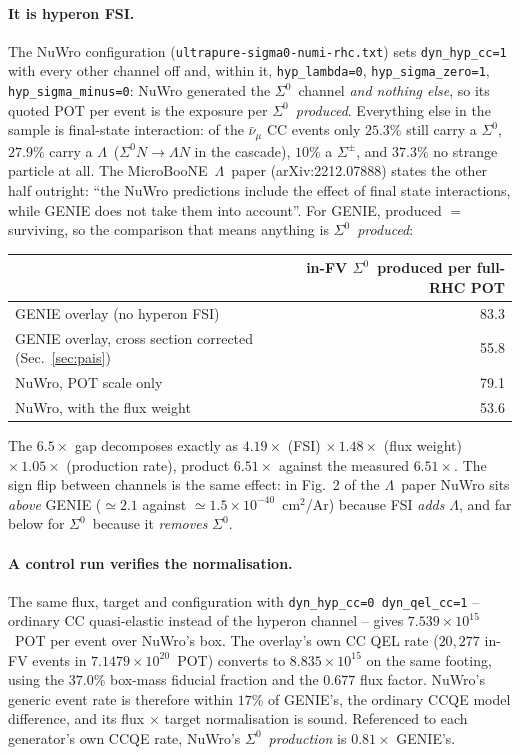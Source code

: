 \documentclass[11pt,a4paper]{article}
\newcommand{\Szero}{\ensuremath{\Sigma^{0}}}
\newcommand{\Lam}{\ensuremath{\Lambda}}
\newcommand{\uboone}{MicroBooNE}
\newcommand{\numubar}{\ensuremath{\bar{\nu}_\mu}}
\begin{document}
\paragraph{It is hyperon FSI.} The NuWro configuration
(\texttt{ultrapure-sigma0-numi-rhc.txt}) sets \texttt{dyn\_hyp\_cc=1} with every
other channel off and, within it, \texttt{hyp\_lambda=0},
\texttt{hyp\_sigma\_zero=1}, \texttt{hyp\_sigma\_minus=0}: NuWro generated the
\Szero\ channel \emph{and nothing else}, so its quoted POT per event is the exposure
per \Szero\ \emph{produced}. Everything else in the sample is final-state
interaction: of the $\numubar$ CC events only $25.3\%$ still carry a \Szero, $27.9\%$
carry a \Lam\ ($\Szero N \to \Lam N$ in the cascade), $10\%$ a $\Sigma^{\pm}$, and
$37.3\%$ no strange particle at all. The \uboone\ \Lam\ paper (arXiv:2212.07888)
states the other half outright: ``the NuWro predictions include the effect of final
state interactions, while GENIE does not take them into account''. For GENIE,
produced $=$ surviving, so the comparison that means anything is \Szero\
\emph{produced}:

\begin{center}
\begin{tabular}{lr}
\toprule
 & in-FV \Szero\ produced per full-RHC POT \\
\midrule
GENIE overlay (no hyperon FSI)      & 83.3 \\
GENIE overlay, cross section corrected (Sec.~\ref{sec:pais}) & 55.8 \\
NuWro, POT scale only               & 79.1 \\
NuWro, with the flux weight         & 53.6 \\
\bottomrule
\end{tabular}
\end{center}

\noindent The $6.5\times$ gap decomposes exactly as $4.19\times$ (FSI) $\times\,
1.48\times$ (flux weight) $\times\, 1.05\times$ (production rate), product
$6.51\times$ against the measured $6.51\times$. The sign flip between channels is
the same effect: in Fig.~2 of the \Lam\ paper NuWro sits \emph{above} GENIE
($\simeq2.1$ against $\simeq1.5 \times 10^{-40}$~cm$^2$/Ar) because FSI \emph{adds}
\Lam, and far below for \Szero\ because it \emph{removes} \Szero.

\paragraph{A control run verifies the normalisation.} The same flux, target and
configuration with \texttt{dyn\_hyp\_cc=0 dyn\_qel\_cc=1} -- ordinary CC
quasi-elastic instead of the hyperon channel -- gives $7.539\times10^{15}$~POT per
event over NuWro's box. The overlay's own CC QEL rate ($20{,}277$ in-FV events in
$7.1479\times10^{20}$~POT) converts to $8.835\times10^{15}$ on the same footing,
using the $37.0\%$ box-mass fiducial fraction and the $0.677$ flux factor. NuWro's
generic event rate is therefore within $17\%$ of GENIE's, the ordinary CCQE model
difference, and its flux $\times$ target normalisation is sound. Referenced to each
generator's own CCQE rate, NuWro's \Szero\ \emph{production} is $0.81\times$ GENIE's.
\end{document}
